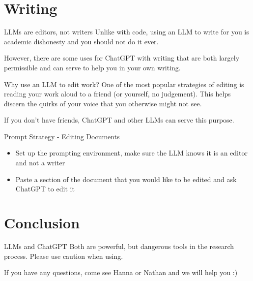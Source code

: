 \documentclass[aspectratio=43]{beamer}
\begin{document}
\section{Writing}
\begin{frame}{LLMs are editors, not writers}
    Unlike with code, using an LLM to write for you is \alert{academic dishonesty} and you should not do it ever. 

    \bigbreak
    However, there are some uses for ChatGPT with writing that are both largely permissible and can serve to help you in your own writing.
\end{frame}
\begin{frame}{Why use an LLM to edit work?}
    One of the most popular strategies of editing is reading your work aloud to a friend (or yourself, no judgement). 
    This helps discern the quirks of your \alert{voice} that you otherwise might not see.

    \bigbreak
    If you don't have friends, ChatGPT and other LLMs can serve this purpose.
\end{frame}
\begin{frame}{Prompt Strategy - Editing Documents}
    \begin{itemize}
        \item Set up the \alert{prompting environment}, make sure the LLM knows it is an editor and not a writer
        \item Paste a section of the document that you would like to be edited and ask ChatGPT to edit it
    \end{itemize}
\end{frame}
\section{Conclusion}
\begin{frame}{LLMs and ChatGPT}
    Both are powerful, but dangerous tools in the research process. Please use caution when using. 
    \bigbreak
    
    If you have any questions, come see Hanna or Nathan and we will help you :)
\end{frame}
\end{document}
